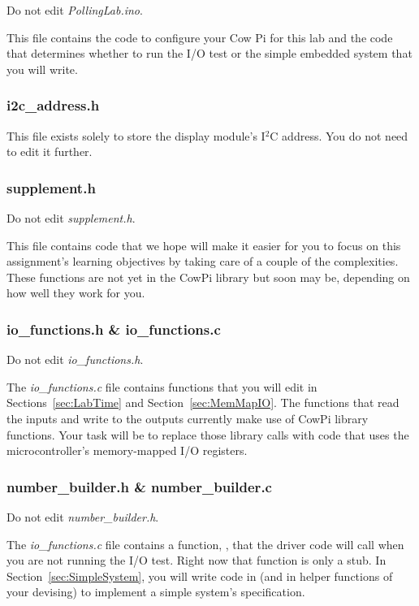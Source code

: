 Do not edit \textit{PollingLab.ino}.

This file contains the code to configure your Cow Pi for this lab and the code that determines whether to run the I/O test or the simple embedded system that you will write.

\subsubsection{i2c\_address.h}

This file exists solely to store the display module's I$^2$C address.
You do not need to edit it further.

\subsubsection{supplement.h}

Do not edit \textit{supplement.h}.

This file contains code that we hope will make it easier for you to focus on this assignment's learning objectives by taking care of a couple of the complexities.
These functions are not yet in the CowPi library but soon may be, depending on how well they work for you.

\subsubsection{io\_functions.h \& io\_functions.c}

Do not edit \textit{io\_functions.h}.

The \textit{io\_functions.c} file contains functions that you will edit in Sections~\ref{sec:LabTime} and Section~\ref{sec:MemMapIO}.
The functions that read the inputs and write to the outputs currently make use of CowPi library functions.
Your task will be to replace those library calls with code that uses the microcontroller's memory-mapped I/O registers.

\subsubsection{number\_builder.h \& number\_builder.c}

Do not edit \textit{number\_builder.h}.

The \textit{io\_functions.c} file contains a function, , that the driver code will call when you are not running the I/O test.
Right now that function is only a stub.
In Section~\ref{sec:SimpleSystem}, you will write code in  (and in helper functions of your devising) to implement a simple system's specification.


